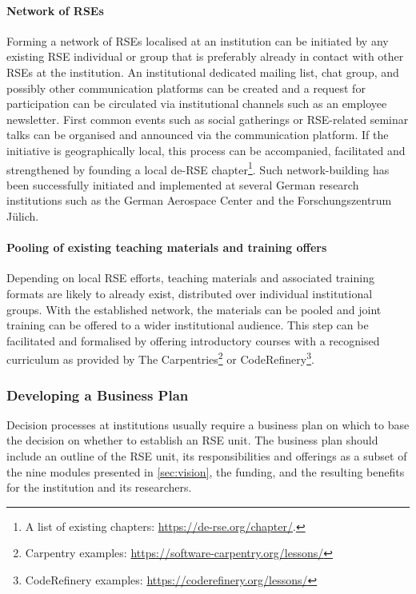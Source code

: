\documentclass[a4paper]{article}
\begin{document}
\paragraph{Network of RSEs}
Forming a network of RSEs localised at an institution can be initiated by any existing RSE individual or group that is preferably already in contact with other RSEs at the institution.
An institutional dedicated mailing list, chat group, and possibly other communication platforms can be created and a request for participation can be circulated via institutional channels such as an employee newsletter.
First common events such as social gatherings or RSE-related seminar talks can be organised and announced via the communication platform.
If the initiative is geographically local, this process can be accompanied, facilitated and strengthened by founding a local de-RSE chapter\footnote{A list of existing chapters: \url{https://de-rse.org/chapter/}.}.
Such network-building has been successfully initiated and implemented at several German research institutions such as the German Aerospace Center and the Forschungszentrum Jülich.

\paragraph{Pooling of existing teaching materials and training offers}
Depending on local RSE efforts, teaching materials and associated training formats are likely to already exist, distributed over individual institutional groups.
With the established network, the materials can be pooled and joint training can be offered to a wider institutional audience.
This step can be facilitated and formalised by offering introductory courses with a recognised curriculum as provided by The Carpentries\footnote{Carpentry examples: \url{https://software-carpentry.org/lessons/}}
or CodeRefinery\footnote{CodeRefinery examples: \url{https://coderefinery.org/lessons/}}.

\subsubsection{Developing a Business Plan}
Decision processes at institutions usually require a business plan on which to base the decision on whether to establish an RSE unit.
The business plan should include an outline of the RSE unit, its responsibilities and offerings as a subset of the nine modules presented in \autoref{sec:vision}, the funding, and the resulting benefits for the institution and its researchers.
\end{document}
